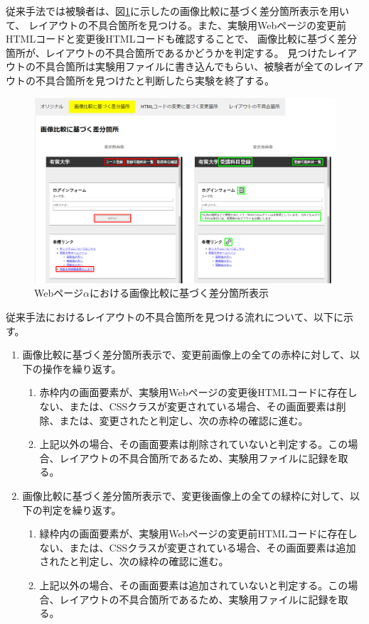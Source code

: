 従来手法では被験者は、図\ref{fig:test1_img}に示した\toolName の画像比較に基づく差分箇所表示を用いて、
レイアウトの不具合箇所を見つける。また、実験用Webページの変更前HTMLコードと変更後HTMLコードも確認することで、
画像比較に基づく差分箇所が、レイアウトの不具合箇所であるかどうかを判定する。
見つけたレイアウトの不具合箇所は実験用ファイルに書き込んでもらい、被験者が全てのレイアウトの不具合箇所を見つけたと判断したら実験を終了する。
\begin{figure}[tp]
    \centering
    \includegraphics[width=1.0\textwidth]{image/5/new_img.png}
    \caption{Webページ$\alpha$における画像比較に基づく差分箇所表示}
    \label{fig:test1_img}
\end{figure}
従来手法におけるレイアウトの不具合箇所を見つける流れについて、以下に示す。
\begin{enumerate}
    \item 画像比較に基づく差分箇所表示で、変更前画像上の全ての赤枠に対して、以下の操作を繰り返す。
          \begin{enumerate}
              \item 赤枠内の画面要素が、実験用Webページの変更後HTMLコードに存在しない、または、CSSクラスが変更されている場合、その画面要素は削除、または、変更されたと判定し、次の赤枠の確認に進む。
              \item 上記以外の場合、その画面要素は削除されていないと判定する。この場合、レイアウトの不具合箇所であるため、実験用ファイルに記録を取る。
          \end{enumerate}
    \item 画像比較に基づく差分箇所表示で、変更後画像上の全ての緑枠に対して、以下の判定を繰り返す。
          \begin{enumerate}
              \item 緑枠内の画面要素が、実験用Webページの変更前HTMLコードに存在しない、または、CSSクラスが変更されている場合、その画面要素は追加されたと判定し、次の緑枠の確認に進む。
              \item 上記以外の場合、その画面要素は追加されていないと判定する。この場合、レイアウトの不具合箇所であるため、実験用ファイルに記録を取る。
          \end{enumerate}
\end{enumerate}


